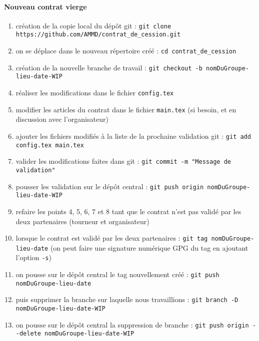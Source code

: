 \documentclass[a4paper]{article}
\begin{document}
\paragraph{Nouveau contrat vierge}
\label{sec:NouveauContratCessionVierge}
\begin{enumerate}
    \item création de la copie local du dépôt git :
    \lstinline{git clone https://github.com/AMMD/contrat_de_cession.git}
    \item on se déplace dans le nouveau répertoire créé :
    \lstinline{cd contrat_de_cession}
    \item création de la nouvelle branche de travail :
    \lstinline{git checkout -b nomDuGroupe-lieu-date-WIP}

    \item réaliser les modifications dans le fichier
    \lstinline{config.tex}
    \item modifier les articles du contrat dans le fichier
    \lstinline{main.tex} (si besoin, et en discussion avec
    l'organisateur)
    \item ajouter les fichiers modifiés à la liste de la prochaine
    validation git : \lstinline{git add config.tex main.tex}

    \item valider les modifications faites dans git :
    \lstinline{git commit -m "Message de validation"}
    \item pousser les validation sur le dépôt central :
    \lstinline{git push origin nomDuGroupe-lieu-date-WIP}
    \item refaire les points 4, 5, 6, 7 et 8 tant que le contrat
    n'est pas validé par les deux partenaires (tourneur et
    organisateur)
    \item lorsque le contrat est validé par les deux partenaires :
    \lstinline{git tag nomDuGroupe-lieu-date} (on peut faire
      une signature numérique GPG du tag en ajoutant l'option
      \lstinline{-s})
    \item on pousse sur le dépôt central le tag nouvellement créé
    : \lstinline{git push nomDuGroupe-lieu-date}
    \item puis supprimer la branche sur laquelle nous travaillions
    : \lstinline{git branch -D nomDuGroupe-lieu-date-WIP}
    \item on pousse sur le dépôt central la suppression de branche
    : \lstinline{git push origin --delete nomDuGroupe-lieu-date-WIP}
\end{enumerate}
\end{document}

